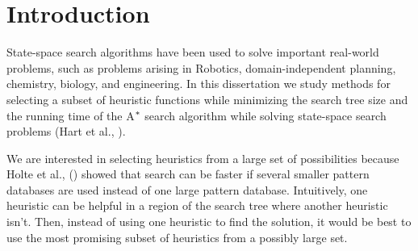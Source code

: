 

\chapter{Introduction}\label{aboutTheProblem}
\noindent
State-space search algorithms have been used to solve important real-world problems, such as problems arising in Robotics, domain-independent planning, chemistry, biology, and engineering. In this dissertation we study methods for selecting a subset of heuristic functions while minimizing the search tree size and the running time of the A$\sp{*}$ search algorithm while solving state-space search problems (Hart et al., \citeyear{hart1968formal}).

We are interested in selecting heuristics from a large set of possibilities because Holte et al., (\citeyear{holte2006maximizing}) showed that search can be faster if several smaller pattern databases are used instead of one large pattern database. %
Intuitively, one heuristic can be helpful in a region of the search tree where another heuristic isn't. Then, instead of using one heuristic to find the solution, it would be best to use the most promising subset of heuristics from a possibly large set.

